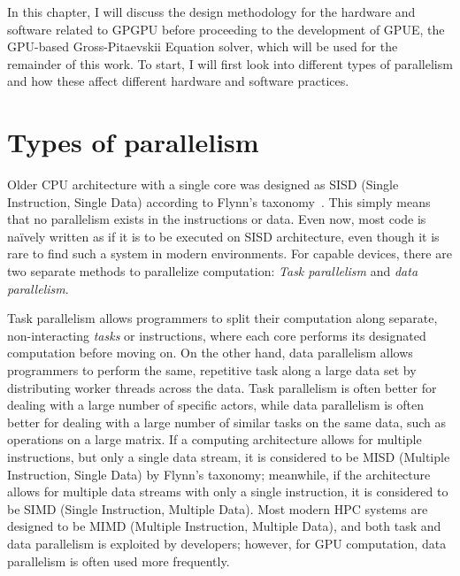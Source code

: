 In this chapter, I will discuss the design methodology for the hardware and software related to GPGPU before proceeding to the development of GPUE, the GPU-based Gross-Pitaevskii Equation solver, which will be used for the remainder of this work.
To start, I will first look into different types of parallelism and how these affect different hardware and software practices.

\section{Types of parallelism}

Older CPU architecture with a single core was designed as SISD (Single Instruction, Single Data) according to Flynn's taxonomy~\cite{gurd1988}. 
This simply means that no parallelism exists in the instructions or data.
Even now, most code is na\"ively written as if it is to be executed on SISD architecture, even though it is rare to find such a system in modern environments.
For capable devices, there are two separate methods to parallelize computation: \textit{Task parallelism} and \textit{data parallelism}.

Task parallelism allows programmers to split their computation along separate, non-interacting \textit{tasks} or instructions, where each core performs its designated computation before moving on.
On the other hand, data parallelism allows programmers to perform the same, repetitive task along a large data set by distributing worker threads across the data.
Task parallelism is often better for dealing with a large number of specific actors, while data parallelism is often better for dealing with a large number of similar tasks on the same data, such as operations on a large matrix.
If a computing architecture allows for multiple instructions, but only a single data stream, it is considered to be MISD (Multiple Instruction, Single Data) by Flynn's taxonomy; meanwhile, if the architecture allows for multiple data streams with only a single instruction, it is considered to be SIMD (Single Instruction, Multiple Data).
Most modern HPC systems are designed to be MIMD (Multiple Instruction, Multiple Data), and both task and data parallelism is exploited by developers; however, for GPU computation, data parallelism is often used more frequently.

